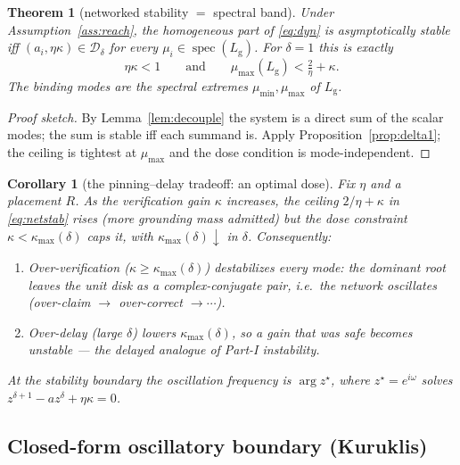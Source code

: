 \documentclass[11pt]{article}
\newtheorem{theorem}{Theorem}
\newtheorem{corollary}{Corollary}
\theoremstyle{definition}
\newcommand{\Lg}{L_{\mathrm g}}
\newcommand{\spec}{\operatorname{spec}}
\begin{document}
\begin{theorem}[networked stability $=$ spectral band]\label{thm:main}
Under Assumption~\ref{ass:reach}, the homogeneous part of \eqref{eq:dyn} is asymptotically
stable iff $(a_i,\eta\kappa)\in\mathcal D_\delta$ for \emph{every} $\mu_i\in\spec(\Lg)$.
For $\delta=1$ this is exactly
\begin{equation}\label{eq:netstab}
  \eta\kappa<1
  \qquad\text{and}\qquad
  \mu_{\max}(\Lg) < \tfrac{2}{\eta}+\kappa .
\end{equation}
The binding modes are the spectral extremes $\mu_{\min},\mu_{\max}$ of $\Lg$.
\end{theorem}
\begin{proof}[Proof sketch] By Lemma~\ref{lem:decouple} the system is a direct sum of the
scalar modes; the sum is stable iff each summand is. Apply Proposition~\ref{prop:delta1}; the
ceiling is tightest at $\mu_{\max}$ and the dose condition is mode-independent. \end{proof}

\begin{corollary}[the pinning--delay tradeoff: an optimal dose]\label{cor:dose}
Fix $\eta$ and a placement $R$. As the verification gain $\kappa$ increases, the ceiling
$2/\eta+\kappa$ in \eqref{eq:netstab} rises (more grounding mass admitted) but the dose
constraint $\kappa<\kappa_{\max}(\delta)$ caps it, with $\kappa_{\max}(\delta)\downarrow$ in
$\delta$. Consequently:
\begin{enumerate}
  \item \emph{Over-verification} ($\kappa\ge\kappa_{\max}(\delta)$) destabilizes every mode:
        the dominant root leaves the unit disk as a complex-conjugate pair, i.e.\ the network
        \emph{oscillates} (over-claim $\to$ over-correct $\to\cdots$).
  \item \emph{Over-delay} (large $\delta$) lowers $\kappa_{\max}(\delta)$, so a gain that was
        safe becomes unstable --- the delayed analogue of Part-I instability.
\end{enumerate}
At the stability boundary the oscillation frequency is $\arg z^\star$, where $z^\star=e^{i\omega}$
solves $z^{\delta+1}-a z^\delta+\eta\kappa=0$.
\end{corollary}

\subsection*{Closed-form oscillatory boundary (Kuruklis)}
\end{document}
